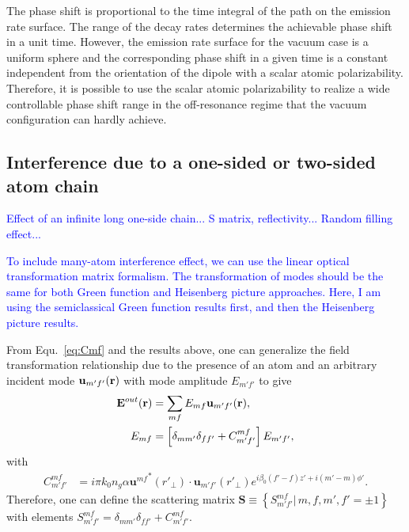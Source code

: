 \documentclass[preprint,aps,pra,onecolumn]{revtex4-1} %
\begin{document}

The phase shift is proportional to the time integral of the path on the emission rate surface. The range of the decay rates determines the achievable phase shift in a unit time. However, the emission rate surface for the vacuum case is a uniform sphere and the corresponding phase shift in a given time is a constant independent from the orientation of the dipole with a scalar atomic polarizability. Therefore, it is possible to use the scalar atomic polarizability to realize a wide controllable phase shift range in the off-resonance regime that the vacuum configuration can hardly achieve. 


\subsection{Interference due to a one-sided or two-sided atom chain}\label{sec:atomchain}
\textcolor{blue}{Effect of an infinite long one-side chain... S matrix, reflectivity... Random filling effect...}

\textcolor{blue}{To include many-atom interference effect, we can use the linear optical transformation matrix formalism. The transformation of modes should be the same for both Green function and Heisenberg picture approaches. Here, I am using the semiclassical Green function results first, and then the Heisenberg picture results. } 


From Equ.~\ref{eq:Cmf} and the results above, one can generalize the field transformation relationship due to the presence of an atom and an arbitrary incident mode $\mathbf{u}_{m'f'}(\mathbf{r})$ with mode amplitude $E_{m'f'}$ to give
\begin{align}
\mathbf{E}^{out}(\mathbf{r}) &= \sum_{mf}E_{mf}\mathbf{u}_{m'f'}(\mathbf{r}),\\
E_{mf} &= \left[\delta_{mm'}\delta_{ff'}+C_{m'f'}^{mf}\right]E_{m'f'},
\end{align}
with 
\begin{align}
C^{mf}_{m'f'}
&= i\pi k_0 n_g\alpha  {\mathbf{u}^{mf}}^*(r'_{\!\perp})\cdot \mathbf{u}_{m'f'}(r'_{\!\perp})e^{i\beta_0 (f'-f)z'+i(m'-m)\phi'}.\label{eq:Cmfmf}
\end{align}
Therefore, one can define the scattering matrix $\mathbf{S}\equiv \left\{S^{mf}_{m'f'}|\,m,f,m',f'=\pm 1 \right\}$ with elements $S^{mf}_{m'f'}=\delta_{mm'}\delta_{ff'}+C_{m'f'}^{mf}$. 
\end{document}
